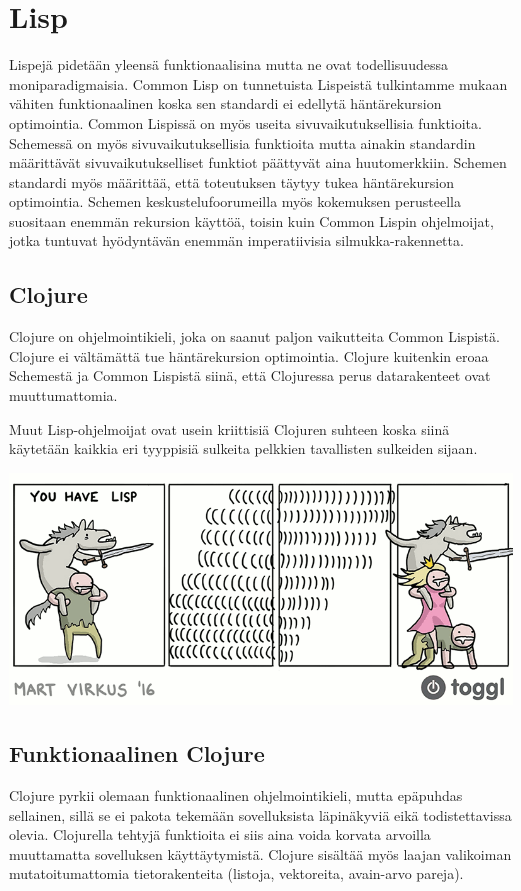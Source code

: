 \documentclass[12pt]{article}
\begin{document}
\newpage
\section{Lisp}
Lispejä pidetään yleensä funktionaalisina mutta ne ovat todellisuudessa moniparadigmaisia. Common Lisp on tunnetuista Lispeistä tulkintamme mukaan vähiten funktionaalinen koska sen standardi ei edellytä häntärekursion optimointia. Common Lispissä on myös useita sivuvaikutuksellisia funktioita. Schemessä on myös sivuvaikutuksellisia funktioita mutta ainakin standardin määrittävät sivuvaikutukselliset funktiot päättyvät aina huutomerkkiin. Schemen standardi myös määrittää, että toteutuksen täytyy tukea häntärekursion optimointia. Schemen keskustelufoorumeilla myös kokemuksen perusteella suositaan enemmän rekursion käyttöä, toisin kuin Common Lispin ohjelmoijat, jotka tuntuvat hyödyntävän enemmän imperatiivisia silmukka-rakennetta.

\subsection{Clojure}
Clojure on ohjelmointikieli, joka on saanut paljon vaikutteita Common Lispistä. Clojure ei vältämättä tue häntärekursion optimointia. Clojure kuitenkin eroaa Schemestä ja Common Lispistä siinä, että Clojuressa perus datarakenteet ovat muuttumattomia. 


Muut Lisp-ohjelmoijat ovat usein kriittisiä Clojuren suhteen koska siinä käytetään kaikkia eri tyyppisiä sulkeita pelkkien tavallisten sulkeiden sijaan.

\includegraphics[width=\textwidth]{sulkeet.png}

\subsection{Funktionaalinen Clojure}
Clojure pyrkii olemaan funktionaalinen ohjelmointikieli, mutta epäpuhdas sellainen, sillä se ei pakota tekemään sovelluksista läpinäkyviä eikä todistettavissa olevia. Clojurella tehtyjä funktioita ei siis aina voida korvata arvoilla muuttamatta sovelluksen käyttäytymistä. Clojure sisältää myös laajan valikoiman mutatoitumattomia tietorakenteita (listoja, vektoreita, avain-arvo pareja).
\end{document}
